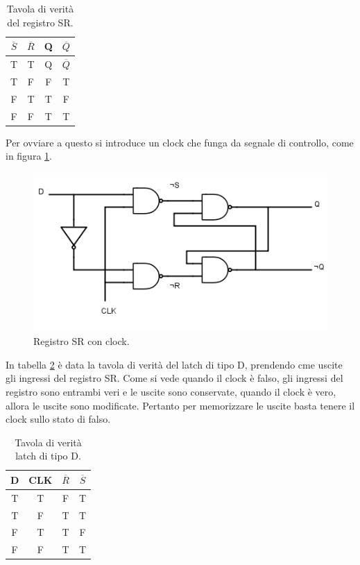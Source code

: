 \documentclass[journal, a4paper]{IEEEtran}
\begin{document}
\begin{table}[htp]
\centering
\caption{Tavola di verità del registro SR.}
\label{tab:sr}
\begin{tabular}{|c|c|c|c|}
\hline 
$\overline{S}$ & $\overline{R}$ & Q & $\overline{Q}$ \\ 
\hline 
T & T & Q & $\overline{Q}$ \\ 
\hline 
T & F & F & T \\ 
\hline 
F & T & T & F \\ 
\hline 
F & F & T & T \\ 
\hline 
\end{tabular} 
\end{table}

Per ovviare a questo si introduce un clock che funga da segnale di controllo, come in figura \ref{fig:latch}.

\begin{figure}[htp]
\centering
\includegraphics[scale=.4]{latch}
\caption{Registro SR con clock.}
\label{fig:latch}
\end{figure}

In tabella \ref{tab:latch} è data la tavola di verità del latch di tipo D, prendendo cme uscite gli ingressi del registro SR. Come si vede quando il clock è falso, gli ingressi del registro sono entrambi veri e le uscite sono conservate, quando il clock è vero, allora le uscite sono modificate. Pertanto per memorizzare le uscite basta tenere il clock sullo stato di falso.

\begin{table}[htp]
\centering
\caption{Tavola di verità latch di tipo D.}
\label{tab:latch}
\begin{tabular}{|c|c|c|c|}
\hline 
D & CLK & $\overline{R}$ & $\overline{S}$ \\ 
\hline 
T & T & F & T \\ 
\hline 
T & F & T & T \\ 
\hline 
F & T & T & F \\ 
\hline 
F & F & T & T \\ 
\hline 
\end{tabular} 
\end{table}
\end{document}
